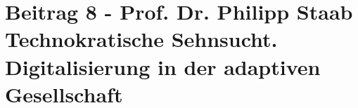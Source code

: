 \section*{Beitrag 8 - Prof. Dr. Philipp Staab
Technokratische Sehnsucht. Digitalisierung in der adaptiven Gesellschaft}